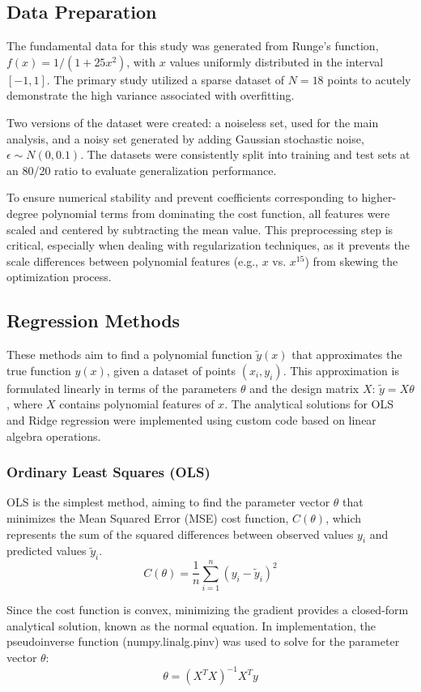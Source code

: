\documentclass[twocolumn,aps]{revtex4}
\begin{document}
\subsection{Data Preparation}
The fundamental data for this study was generated from Runge's function, $f(x)=1/(1+25x^2)$, with $x$ values uniformly distributed in the interval $[-1,1]$. 
The primary study utilized a sparse dataset of $N=18$ points to acutely demonstrate the high variance associated with overfitting. 

Two versions of the dataset were created: a noiseless set, used for the main analysis, and a noisy set generated by adding Gaussian stochastic noise, $\epsilon \sim N(0,0.1)$. 
The datasets were consistently split into training and test sets at an 80/20 ratio to evaluate generalization performance.

To ensure numerical stability and prevent coefficients corresponding to higher-degree polynomial terms from dominating the cost function, all features were scaled and centered by subtracting the mean value. 
This preprocessing step is critical, especially when dealing with regularization techniques, as it prevents the scale differences between polynomial features (e.g., $x$ vs. $x^{15}$) from skewing the optimization process.


\subsection{Regression Methods}
These methods aim to find a polynomial function $\tilde{y}(x)$ that approximates the true function $y(x)$, given a dataset of points $(x_i,y_i)$. 
This approximation is formulated linearly in terms of the parameters $\theta$ and the design matrix $X$: $\tilde{y}=X\theta$, where $X$ contains polynomial features of $x$. 
The analytical solutions for OLS and Ridge regression were implemented using custom code based on linear algebra operations.

\subsubsection{Ordinary Least Squares (OLS)}
OLS is the simplest method, aiming to find the parameter vector $\theta$ that minimizes the Mean Squared Error (MSE) cost function, $C(\theta)$, which represents the sum of the squared differences between observed values $y_i$ and predicted values $\tilde{y}_i$.
$$C(\theta)=\frac{1}{n}\sum_{i=1}^{n}(y_i-\tilde{y}_i)^2$$

Since the cost function is convex, minimizing the gradient provides a closed-form analytical solution, known as the normal equation. 
In implementation, the pseudoinverse function (numpy.linalg.pinv) was used to solve for the parameter vector $\theta$:
$$\theta=(X^TX)^{-1}X^Ty$$
\end{document}
